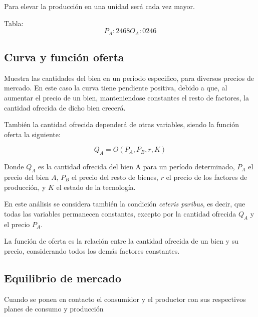 Para elevar la producción en una unidad será cada vez mayor.

Tabla:
\begin{equation*}
    P_A: 2 4 6 8
    O_A: 0 2 4 6
\end{equation*}

\subsection{Curva y función oferta}

Muestra las cantidades del bien en un periodo especifico,
para diversos precios de mercado.
En este caso la curva tiene pendiente positiva,
debido a que,
al aumentar el precio de un bien,
manteniendose constantes el resto de factores,
la cantidad ofrecida de dicho bien crecerá.

También la cantidad ofrecida dependerá de otras variables,
siendo la función oferta la siguiente:

\begin{equation*}
    Q_A = O(P_A, P_B, r, K)
\end{equation*}

Donde \(Q_A\) es la cantidad ofrecida del bien A para un período determinado,
\(P_A\) el precio del bien \(A\),
\(P_B\) el precio del resto de bienes,
\(r\) el precio de los factores de producción,
y \(K\) el estado de la tecnología.

En este análisis se considera también la condición \textit{ceteris paribus},
es decir, que todas las variables permanecen constantes,
excepto por la cantidad ofrecida \(Q_A\) y el precio \(P_A\).

La función de oferta es la relación entre la cantidad ofrecida de un bien y su precio,
considerando todos los demás factores constantes.

\begin{center}
\end{center}

\subsection{Equilibrio de mercado}

Cuando se ponen en contacto el consumidor y el productor con sus respectivos planes de consumo y producción